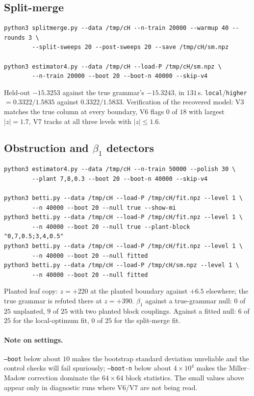 \documentclass[11pt,a4paper]{article}
\theoremstyle{plain}
\theoremstyle{definition}
\begin{document}
\subsection*{Split-merge}

\begin{verbatim}
python3 splitmerge.py --data /tmp/cH --n-train 20000 --warmup 40 --rounds 3 \
        --split-sweeps 20 --post-sweeps 20 --save /tmp/cH/sm.npz

python3 estimator4.py --data /tmp/cH --load-P /tmp/cH/sm.npz \
        --n-train 20000 --boot 20 --boot-n 40000 --skip-v4
\end{verbatim}
Held-out $-15.3253$ against the true grammar's $-15.3243$, in $131$\,s.
\texttt{local}/\texttt{higher} $=0.3322/1.5835$ against $0.3322/1.5833$.
Verification of the recovered model: V3 matches the true column at every
boundary, V6 flags $0$ of $18$ with largest $|z|=1.7$, V7 tracks at all three
levels with $|z|\le1.6$.

\subsection*{Obstruction and $\beta_1$ detectors}

\begin{verbatim}
python3 estimator4.py --data /tmp/cH --n-train 50000 --polish 30 \
        --plant 7,8,0.3 --boot 20 --boot-n 40000 --skip-v4

python3 betti.py --data /tmp/cH --load-P /tmp/cH/fit.npz --level 1 \
        --n 40000 --boot 20 --null true --show-mi
python3 betti.py --data /tmp/cH --load-P /tmp/cH/fit.npz --level 1 \
        --n 40000 --boot 20 --null true --plant-block "0,7,0.5;3,4,0.5"
python3 betti.py --data /tmp/cH --load-P /tmp/cH/fit.npz --level 1 \
        --n 40000 --boot 20 --null fitted
python3 betti.py --data /tmp/cH --load-P /tmp/cH/sm.npz --level 1 \
        --n 40000 --boot 20 --null fitted
\end{verbatim}
Planted leaf copy: $z=+220$ at the planted boundary against $+6.5$ elsewhere;
the true grammar is refuted there at $z=+390$. $\beta_1$ against a true-grammar
null: $0$ of $25$ unplanted, $9$ of $25$ with two planted block couplings.
Against a fitted null: $6$ of $25$ for the local-optimum fit, $0$ of $25$ for
the split-merge fit.

\paragraph{Note on settings.} \texttt{--boot} below about $10$ makes the
bootstrap standard deviation unreliable and the control checks will fail
spuriously; \texttt{--boot-n} below about $4\times10^4$ makes the Miller--Madow
correction dominate the $64\times64$ block statistics. The small values above
appear only in diagnostic runs where V6/V7 are not being read.
\end{document}

